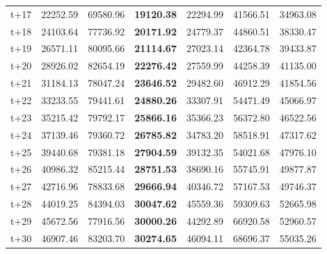 \begin{table}[H]
\begin{tabular}{lrrrrrr}
t+17  & 22252.59  & 69580.96  & \textbf{19120.38}  & 22294.99  & 41566.51  & 34963.08  \\
t+18  & 24103.64  & 77736.92  & \textbf{20171.92}  & 24779.37  & 44860.51  & 38330.47  \\
t+19  & 26571.11  & 80095.66  & \textbf{21114.67}  & 27023.14  & 42364.78  & 39433.87  \\
t+20  & 28926.02  & 82654.19  & \textbf{22276.42}  & 27559.99  & 44258.39  & 41135.00  \\
t+21  & 31184.13  & 78047.24  & \textbf{23646.52}  & 29482.60  & 46912.29  & 41854.56  \\
t+22  & 33233.55  & 79441.61  & \textbf{24880.26}  & 33307.91  & 54471.49  & 45066.97  \\
t+23  & 35215.42  & 79792.17  & \textbf{25866.16}  & 35366.23  & 56372.80  & 46522.56  \\
t+24  & 37139.46  & 79360.72  & \textbf{26785.82}  & 34783.20  & 58518.91  & 47317.62  \\
t+25  & 39440.68  & 79381.18  & \textbf{27904.59}  & 39132.35  & 54021.68  & 47976.10  \\
t+26  & 40986.32  & 85215.44  & \textbf{28751.53}  & 38690.16  & 55745.91  & 49877.87  \\
t+27  & 42716.96  & 78833.68  & \textbf{29666.94}  & 40346.72  & 57167.53  & 49746.37  \\
t+28  & 44019.25  & 84394.03  & \textbf{30047.62}  & 45559.36  & 59309.63  & 52665.98  \\
t+29  & 45672.56  & 77916.56  & \textbf{30000.26}  & 44292.89  & 66920.58  & 52960.57  \\
t+30  & 46907.46  & 83203.70  & \textbf{30274.65}  & 46094.11  & 68696.37  & 55035.26  \\

\bottomrule
\end{tabular}
\end{table}
